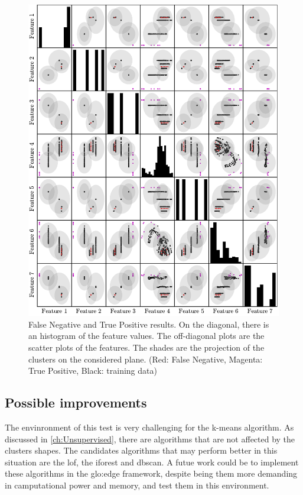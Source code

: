 \begin{figure}
    \centering
    \includegraphics{Images/shaker/ConfusionMatrix.pdf}
    \caption{False Negative and True Positive results. On the diagonal, there is an histogram of the feature values. The off-diagonal plots are the scatter plots of the features. The shades are the projection of the clusters on the considered plane. (Red: False Negative, Magenta: True Positive, Black: training data)}
    \label{fig:shaker_conf_matrix}
\end{figure}

\subsection{Possible improvements}
The envinronment of this test is very challenging for the k-means algorithm. As discussed in \autoref{ch:Unsupervised}, there are algorithms that are not affected by the clusters shapes. The candidates algorithms that may perform better in this situation are the \gls{lof}, the \gls{iforest} and \gls{dbscan}. A futue work could be to implement these algorithms in the \gls{glo:edge} framework, despite being them more demanding in camputational power and memory, and test them in this environment.

